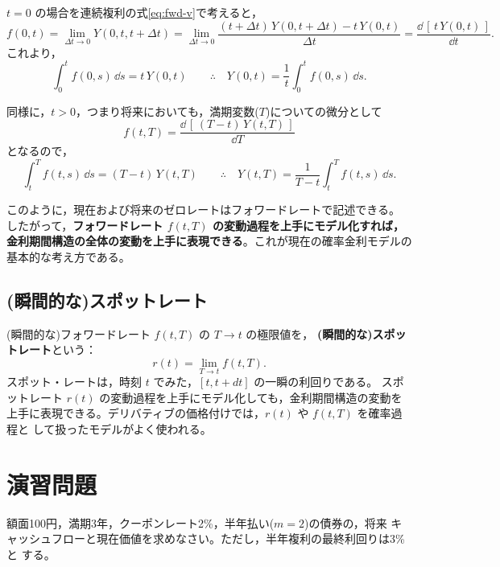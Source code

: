 $t=0$ の場合を連続複利の式\eqref{eq:fwd-v}で考えると，
\begin{equation}
f(0,t) = \lim_{\Delta t\to 0} Y(0,t,t+\Delta t)
= \lim_{\Delta t\to 0}
\frac{(t+\Delta t)\,Y(0,t+\Delta t) - t\,Y(0,t)}{\Delta t}
= \frac{\dd\,[\,t\,Y(0,t)\,]}{\dd t}.
\end{equation}
これより，
\begin{equation}
\int_0^t f(0,s)\,\dd s = t\,Y(0,t)
\qquad\therefore\quad
Y(0,t) = \frac{1}{t}\int_0^t f(0,s)\,\dd s.
\end{equation}

同様に，$t>0$，つまり将来においても，満期変数($T$)についての微分として
\begin{equation}
f(t,T) = \frac{\dd\,[\,(T-t)\,Y(t,T)\,]}{\dd T}
\end{equation}
となるので，
\begin{equation}
\int_t^T f(t,s)\,\dd s = (T-t)\,Y(t,T)
\qquad\therefore\quad
Y(t,T) = \frac{1}{T-t}\int_t^T f(t,s)\,\dd s.
\end{equation}

このように，現在および将来のゼロレートはフォワードレートで記述できる。
したがって，\textbf{フォワードレート $f(t,T)$ の変動過程を上手にモデル化すれば，
金利期間構造の全体の変動を上手に表現できる}。これが現在の確率金利モデルの
基本的な考え方である。

\subsection*{(瞬間的な)スポットレート}

(瞬間的な)フォワードレート $f(t,T)$ の $T \to t$ の極限値を，
\textbf{(瞬間的な)スポットレート}という：
\begin{equation}
r(t) = \lim_{T\to t} f(t,T).
\end{equation}
スポット・レートは，時刻 $t$ でみた，$[t, t+dt]$ の一瞬の利回りである。
スポットレート $r(t)$ の変動過程を上手にモデル化しても，金利期間構造の変動を
上手に表現できる。デリバティブの価格付けでは，$r(t)$ や $f(t,T)$ を確率過程と
して扱ったモデルがよく使われる。

\section{演習問題}

\begin{exercise}[問題3-1：債券価格と最終利回り]
額面100円，満期3年，クーポンレート2\%，半年払い($m=2$)の債券の，将来
キャッシュフローと現在価値を求めなさい。ただし，半年複利の最終利回りは3\%と
する。
\end{exercise}

